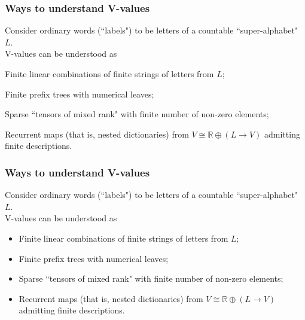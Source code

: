 \documentclass{beamer}
\newcommand{\msgray}[1]{{\color{mygray} #1}}
\begin{document}
\begin{frame}

  \frametitle{Ways to understand V-values}

Consider ordinary words (``labels") to be letters of a countable ``super-alphabet" $L$.\\[2ex]

V-values can be understood as

\begin{itemize}


  \item Finite linear combinations of finite strings of letters from $L$;
  \item Finite prefix trees with numerical leaves;
  \item Sparse ``tensors of mixed rank" with finite number of non-zero elements;
\msgray{
  \item Recurrent maps (that is, nested dictionaries) from $V \cong \mathbb{R}\oplus (L \rightarrow V)$  admitting finite descriptions.
}

\end{itemize}


\end{frame}


\begin{frame}

  \frametitle{Ways to understand V-values}

Consider ordinary words (``labels") to be letters of a countable ``super-alphabet" $L$.\\[2ex]

V-values can be understood as

\begin{itemize}

  \item Finite linear combinations of finite strings of letters from $L$;
  \item Finite prefix trees with numerical leaves;
  \item Sparse ``tensors of mixed rank" with finite number of non-zero elements;
  \item Recurrent maps (that is, nested dictionaries) from $V \cong \mathbb{R}\oplus (L \rightarrow V)$  admitting finite descriptions.

\end{itemize}

\end{frame}
\end{document}
